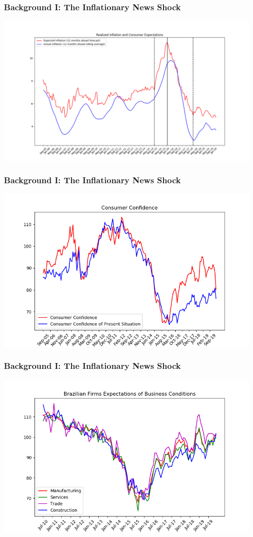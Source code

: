 \documentclass[aspectratio=169]{beamer}
\begin{document}
			\begin{frame}
				\frametitle{Background I: The Inflationary News Shock}
					\centering
					\includegraphics[scale=.35]{tables-figures/Realized_Inflation_and_Consumer_Expectations.png}
			\end{frame}

			\begin{frame}
				\frametitle{Background I: The Inflationary News Shock}
					\centering
					\includegraphics[scale=.55]{old_figures/IBRE_Consumer_Expectations}
			\end{frame}

			\begin{frame}
				\frametitle{Background I: The Inflationary News Shock}
					\centering
					\includegraphics[scale=.55]{old_figures/IBRE_Firm_Expectations}
			\end{frame}
			
\end{document}
